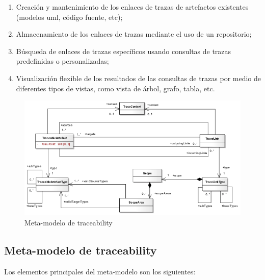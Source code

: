\documentclass[a4paper,12pt,oneside,spanish]{book}
\begin{document}
\begin{enumerate}
\item Creación y mantenimiento de los enlaces de trazas de artefactos existentes (modelos \gls{uml}, código fuente, etc);
\item Almacenamiento de los enlaces de trazas mediante el uso de un repositorio;
\item Búsqueda de enlaces de trazas específicos usando consultas de trazas predefinidas o personalizadas;
\item Visualización flexible de los resultados de las consultas de trazas por medio de diferentes tipos de vistas, como vista de árbol, grafo, tabla, etc.
\end{enumerate}

\begin{figure}[hbtp]
\centering
\includegraphics[scale=.6]{./img/Traceability_Metamodel}
\caption{Meta-modelo de traceability}
\label{fig:SPLMeta-modelo}
\end{figure}

\subsection{Meta-modelo de traceability}

Los elementos principales del meta-modelo son los siguientes:
\end{document}
